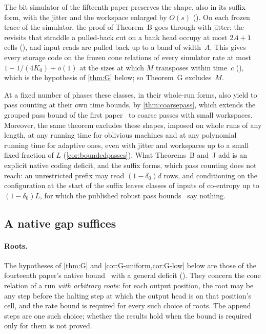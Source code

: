 \begin{outline}
The bit simulator of the fifteenth paper preserves the shape, also in its suffix form, with the jitter and the workspace enlarged by
$O(s)$ (). On each frozen trace of the simulator, the proof of Theorem~B goes through with
jitter: the revisits that straddle a pulled-back cut on a bank head occupy at most $2A+1$ cells (), and input reads
are pulled back up to a band of width~$A$. This gives every storage code on the frozen cone relations of every simulator rate at most
$1-1/(4K_0)+o(1)$ at the sizes at which $M$ transposes within time~$c$ (), which is the hypothesis
of \cref{thm:G} below; so Theorem~G excludes~$M$.
\end{outline}

At a fixed number of phases these classes, in their whole-run forms, also yield to pass counting at their own time bounds, by
\cref{thm:coarsepass}, which extends the grouped pass bound of the first paper~\cite[Theorems~5.8 and~5.12]{FirstPaper2026} to coarse
passes with small workspaces. Moreover, the same theorem excludes these shapes, imposed on whole runs of any length, at any running time
for oblivious machines and at any polynomial running time for adaptive ones, even with jitter and workspaces up to a small fixed fraction
of $L$ (\cref{cor:boundedpasses}). What Theorems~B and~J add is an explicit native coding
deficit, and the suffix forms, which pass counting does not reach: an unrestricted prefix may read $(1-\delta_0)d$ rows, and conditioning on the configuration at the start of the suffix
leaves classes of inputs of co-entropy up to $(1-\delta_0)L$, for which the published robust pass bounds~\cite{FirstPaper2026,PassesMemo2026}
say nothing.

\subsection{A native gap suffices}

\paragraph{Roots.} The hypotheses of \cref{thm:G} and \cref{cor:G-uniform,cor:G-low} below are those of the fourteenth paper's native
bound~\cite[Corollary~L]{BoundedStack2026} with a general deficit (). They concern the cone relation of a run
\emph{with arbitrary roots}: for each output position, the root may be any step before the halting step at which the output head is on
that position's cell, and the rate bound is required for every such choice of roots. The append steps are one such choice; whether the
results hold when the bound is required only for them is not proved.

